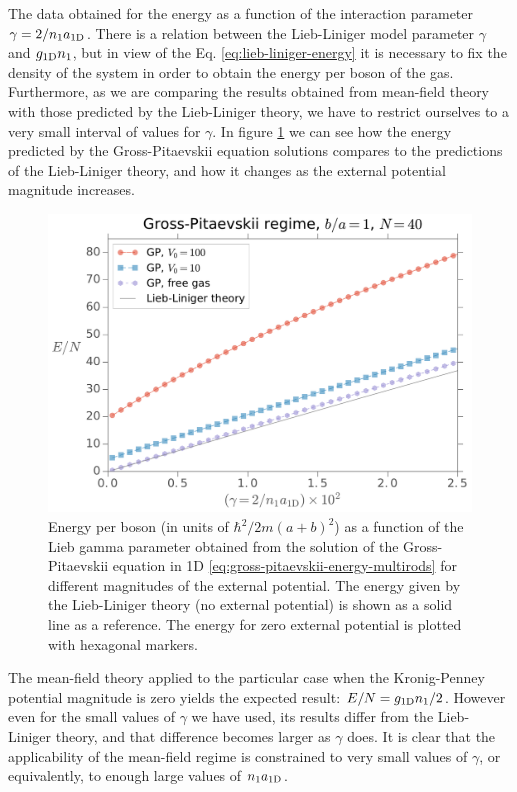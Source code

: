 The data obtained for the energy as a function of the interaction parameter $\gamma = 2 / {{n}_1} a_{ \mathrm{1D} }$. There
is a relation between the Lieb-Liniger model parameter $\gamma$ and $g_{ \mathrm{1D} } {{n}_1}$, but in view of
the Eq. \eqref{eq:lieb-liniger-energy} it is necessary to fix the density of the system in order to obtain the
energy per boson of the gas. Furthermore, as we are comparing the results obtained from mean-field theory with those
predicted by the Lieb-Liniger theory, we have to restrict ourselves to a very small interval of values for $\gamma$.
In figure \ref{fig:gross-pitaevskii-energy-as-gamma-nb-40} we can see how the energy
predicted by the Gross-Pitaevskii equation solutions compares to the predictions of the Lieb-Liniger theory, and how it
changes as the external potential magnitude increases.
%
\begin{figure}[t!]
	\centering
	\includegraphics[width=0.75\linewidth]{./figures/gp_energy-as-gamma_Nb-40}
	\caption{
		Energy per boson (in units of $\hbar^2 / 2m(a+b)^2$) as a function of the Lieb gamma parameter obtained from the solution of the Gross-Pitaevskii equation in 1D \eqref{eq:gross-pitaevskii-energy-multirods} for different magnitudes of the external potential. The energy given by the Lieb-Liniger theory (no external potential) is shown as a solid line as a reference. The energy for zero external potential is plotted with hexagonal markers.
	}
	\label{fig:gross-pitaevskii-energy-as-gamma-nb-40}
\end{figure}
%
The mean-field theory applied to the particular case when the Kronig-Penney potential magnitude is zero yields
the expected result: $E / N = g_{ \mathrm{1D} } {{n}_1} / 2$. However even for the small values of $\gamma$ we have used,
its results differ from the Lieb-Liniger theory, and that difference becomes larger as $\gamma$ does. It is clear that
the applicability of the mean-field regime is constrained to very small values of $\gamma$, or equivalently, to enough
large values of ${{n}_1} a_{ \mathrm{1D} }$.


